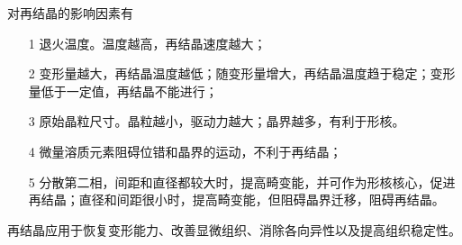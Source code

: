             对再结晶的影响因素有
            \begin{itemize}
                \item[1] 退火温度。温度越高，再结晶速度越大；
                \item[2] 变形量越大，再结晶温度越低；随变形量增大，再结晶温度趋于稳定；变形量低于一定值，再结晶不能进行；
                \item[3] 原始晶粒尺寸。晶粒越小，驱动力越大；晶界越多，有利于形核。
                \item[4] 微量溶质元素阻碍位错和晶界的运动，不利于再结晶；
                \item[5] 分散第二相，间距和直径都较大时，提高畸变能，并可作为形核核心，促进再结晶；直径和间距很小时，提高畸变能，但阻碍晶界迁移，阻碍再结晶。
            \end{itemize}

            再结晶应用于恢复变形能力、改善显微组织、消除各向异性以及提高组织稳定性。
